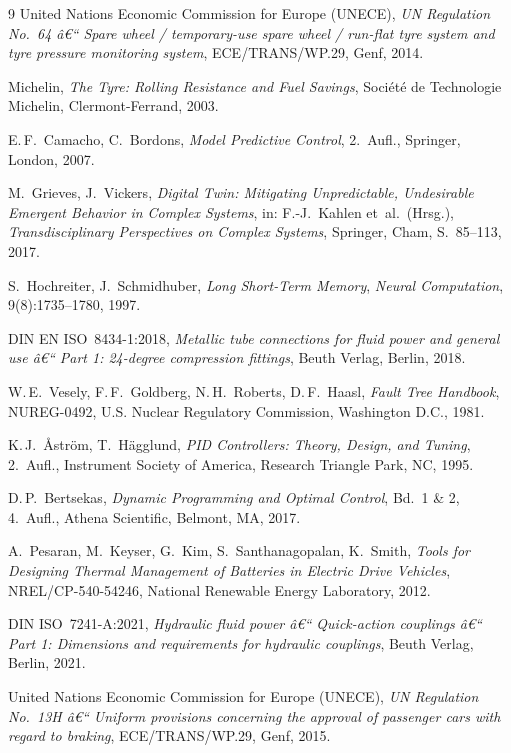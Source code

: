 ﻿\documentclass[a4paper,12pt]{article}
\theoremstyle{definition}
\begin{document}
\begin{thebibliography}{9}
United Nations Economic Commission for Europe (UNECE),
\textit{UN Regulation No.~64 â€“ Spare wheel / temporary-use spare wheel / run-flat tyre
system and tyre pressure monitoring system},
ECE/TRANS/WP.29, Genf, 2014.

Michelin,
\textit{The Tyre: Rolling Resistance and Fuel Savings},
Société de Technologie Michelin, Clermont-Ferrand, 2003.

E.\,F.~Camacho, C.~Bordons,
\textit{Model Predictive Control},
2.~Aufl., Springer, London, 2007.

M.~Grieves, J.~Vickers,
\textit{Digital Twin: Mitigating Unpredictable, Undesirable Emergent Behavior in
Complex Systems},
in: F.-J.~Kahlen et~al.~(Hrsg.), \textit{Transdisciplinary Perspectives on
Complex Systems}, Springer, Cham, S.~85--113, 2017.

S.~Hochreiter, J.~Schmidhuber,
\textit{Long Short-Term Memory},
\textit{Neural Computation}, 9(8):1735--1780, 1997.

DIN EN ISO~8434-1:2018,
\textit{Metallic tube connections for fluid power and general use â€“ Part 1: 24-degree
compression fittings},
Beuth Verlag, Berlin, 2018.

W.\,E.~Vesely, F.\,F.~Goldberg, N.\,H.~Roberts, D.\,F.~Haasl,
\textit{Fault Tree Handbook},
NUREG-0492, U.S. Nuclear Regulatory Commission, Washington D.C., 1981.

K.\,J.~\AA{}str\"{o}m, T.~H\"{a}gglund,
\textit{PID Controllers: Theory, Design, and Tuning},
2.~Aufl., Instrument Society of America, Research Triangle Park, NC, 1995.

D.\,P.~Bertsekas,
\textit{Dynamic Programming and Optimal Control}, Bd.~1 \& 2,
4.~Aufl., Athena Scientific, Belmont, MA, 2017.

A.~Pesaran, M.~Keyser, G.~Kim, S.~Santhanagopalan, K.~Smith,
\textit{Tools for Designing Thermal Management of Batteries in Electric Drive Vehicles},
NREL/CP-540-54246, National Renewable Energy Laboratory, 2012.

DIN ISO~7241-A:2021,
\textit{Hydraulic fluid power â€“ Quick-action couplings â€“ Part 1: Dimensions and
requirements for hydraulic couplings},
Beuth Verlag, Berlin, 2021.

United Nations Economic Commission for Europe (UNECE),
\textit{UN Regulation No.~13H â€“ Uniform provisions concerning the approval of passenger
cars with regard to braking},
ECE/TRANS/WP.29, Genf, 2015.


\end{thebibliography}
\end{document}
